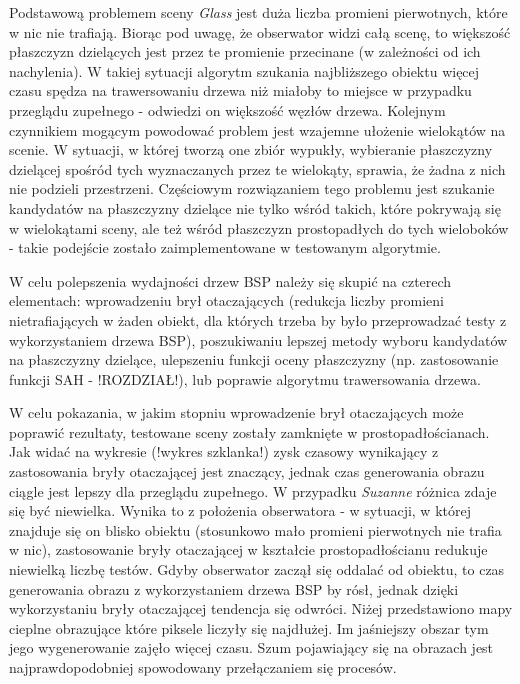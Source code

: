 Podstawową problemem sceny \emph{Glass} jest duża liczba promieni pierwotnych, które w nic nie trafiają. Biorąc pod uwagę, że obserwator widzi całą scenę, to większość płaszczyzn dzielących jest przez te promienie przecinane (w zależności od ich nachylenia). W takiej sytuacji algorytm szukania najbliższego obiektu więcej czasu spędza na trawersowaniu drzewa niż miałoby to miejsce w przypadku przeglądu zupełnego - odwiedzi on większość węzłów drzewa. Kolejnym czynnikiem mogącym powodować problem jest wzajemne ułożenie wielokątów na scenie. W sytuacji, w której tworzą one zbiór wypukły, wybieranie płaszczyzny dzielącej spośród tych wyznaczanych przez te wielokąty, sprawia, że żadna z nich nie podzieli przestrzeni. Częściowym rozwiązaniem tego problemu jest szukanie kandydatów na płaszczyzny dzielące nie tylko wśród takich, które pokrywają się w wielokątami sceny, ale też wśród płaszczyzn prostopadłych do tych wieloboków - takie podejście zostało zaimplementowane w testowanym algorytmie.

W celu polepszenia wydajności drzew BSP należy się skupić na czterech elementach: wprowadzeniu brył otaczających (redukcja liczby promieni nietrafiających w żaden obiekt, dla których trzeba by było przeprowadzać testy z wykorzystaniem drzewa BSP), poszukiwaniu lepszej metody wyboru kandydatów na płaszczyzny dzielące, ulepszeniu funkcji oceny płaszczyzny (np. zastosowanie funkcji SAH - !ROZDZIAŁ!), lub poprawie algorytmu trawersowania drzewa.

W celu pokazania, w jakim stopniu wprowadzenie brył otaczających może poprawić rezultaty, testowane sceny zostały zamknięte w prostopadłościanach. Jak widać na wykresie (!wykres szklanka!) zysk czasowy wynikający z zastosowania bryły otaczającej jest znaczący, jednak czas generowania obrazu ciągle jest lepszy dla przeglądu zupełnego. W przypadku \emph{Suzanne} różnica zdaje się być niewielka. Wynika to z położenia obserwatora - w sytuacji, w której znajduje się on blisko obiektu (stosunkowo mało promieni pierwotnych nie trafia w nic), zastosowanie bryły otaczającej w kształcie prostopadłościanu redukuje niewielką liczbę testów. Gdyby obserwator zaczął się oddalać od obiektu, to czas generowania obrazu z wykorzystaniem drzewa BSP by rósł, jednak dzięki wykorzystaniu bryły otaczającej tendencja się odwróci. Niżej przedstawiono mapy cieplne obrazujące które piksele liczyły się najdłużej. Im jaśniejszy obszar tym jego wygenerowanie zajęło więcej czasu. Szum pojawiający się na obrazach jest najprawdopodobniej spowodowany przełączaniem się procesów.

